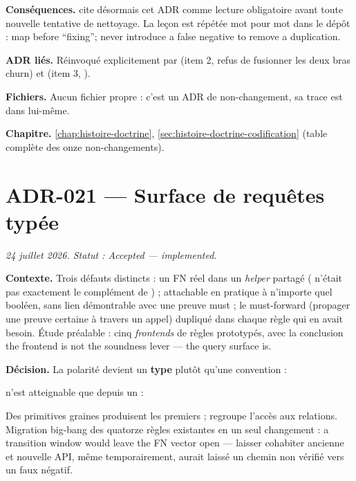 \textbf{Conséquences.}  cite désormais cet ADR comme lecture
obligatoire avant toute nouvelle tentative de \og nettoyage\fg{}. La leçon est
répétée mot pour mot dans le dépôt : \og map before ``fixing''; never
introduce a false negative to remove a duplication\fg{}.

\textbf{ADR liés.} Réinvoqué explicitement par  (item 2, refus de
fusionner les deux bras churn) et  (item 3, ).

\textbf{Fichiers.} Aucun fichier propre : c'est un ADR de non-changement, sa
trace est dans  lui-même.

\textbf{Chapitre.} \cref{chap:histoire-doctrine}, \cref{sec:histoire-doctrine-codification}
(table complète des onze non-changements).

\section{ADR-021 --- Surface de requêtes typée}
\label{adr:21}
\noindent\textit{24 juillet 2026. Statut : Accepted --- implemented.}

\textbf{Contexte.} Trois défauts distincts : un FN réel dans un \emph{helper}
partagé ( n'était pas exactement le complément de
) ;  attachable en pratique à
n'importe quel booléen, sans lien démontrable avec une preuve must ; le
\og must-forward\fg{} (propager une preuve certaine à travers un appel)
dupliqué dans chaque règle qui en avait besoin. Étude préalable : cinq
\emph{frontends} de règles prototypés, avec la conclusion \og the frontend is
not the soundness lever --- the query surface is\fg{}.

\textbf{Décision.} La polarité devient un \textbf{type} plutôt qu'une
convention :


 n'est atteignable que depuis un  :


Des primitives \og graines\fg{} produisent les premiers  ;
 regroupe l'accès aux relations. Migration \og big-bang\fg{} des
quatorze règles existantes en un seul changement : \og a transition window
would leave the FN vector open\fg{} --- laisser cohabiter ancienne et nouvelle
API, même temporairement, aurait laissé un chemin non vérifié vers un faux
négatif.

